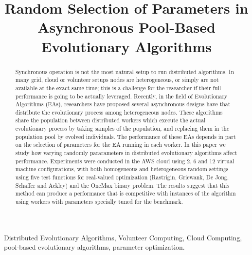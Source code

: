 \documentclass[conference]{IEEEtran}
\begin{document}
\title{Random Selection of Parameters in Asynchronous Pool-Based Evolutionary Algorithms\\
}

\author{
  \and
}

\maketitle
\begin{abstract}
  Synchronous operation is not the most natural setup to run distributed
algorithms. In many grid, cloud or volunteer setups nodes are
heterogeneous, or simply are not available at the exact same time;
this is a challenge for the researcher if their full performance is
going to be actually leveraged. Recently, in the field of Evolutionary
Algorithms (EAs), researchers have proposed several asynchronous 
designs have that distribute the evolutionary process among 
heterogeneous nodes. These algorithms share the population between distributed
workers which execute the actual evolutionary process by taking
samples of the population, and replacing them in the population pool
by evolved individuals. The performance of these EAs depends in part
on the selection of parameters for the EA running in each worker. In
this paper we study how varying randomly pararameters in distributed
evolutionary algorithms affect performance. Experiments 
were conducted in the AWS cloud using 2, 6 and 12
virtual machine configurations, with both homogeneous and
heterogeneous random settings using five test functions for
real-valued optimization (Rastrigin, Griewank, De Jong, Schaffer and
Ackley) and the OneMax binary problem. The results suggest that
this method can produce a performance that is competitive with 
instances of the algorithm using workers with parameters 
specially tuned for the benchmark.
\end{abstract}


\begin{IEEEkeywords}
  Distributed Evolutionary Algorithms, Volunteer Computing,
  Cloud Computing, pool-based evolutionary algorithms, parameter optimization. 
\end{IEEEkeywords}
\end{document}
